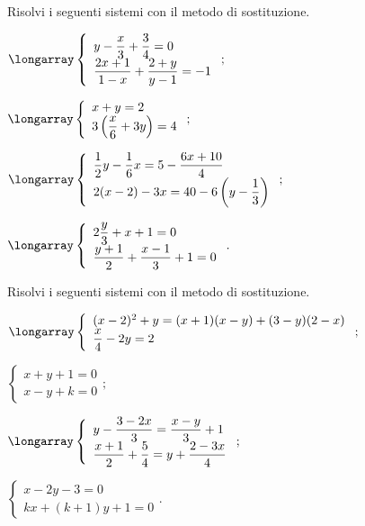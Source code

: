 \begin{esercizio}[\Ast]
 \label{ese:22.12}
Risolvi i seguenti sistemi con il metodo di sostituzione.
 \begin{multicols}{2}
 \begin{enumeratea}
  \item $\longarray\left\{\begin{array}{l}y-\dfrac{x}{3}+\dfrac{3}{4}=0\\\dfrac{2x+1}{1-x}+\dfrac{2+y}{y-1}=-1\end{array}\right.;$
\item $\longarray\left\{\begin{array}{l}x+y=2\\3\left(\dfrac{x}{6}+3y\right)=4\end{array}\right.;$
\item $\longarray\left\{\begin{array}{l}\dfrac{1}{2}y-\dfrac{1}{6}x=5-\dfrac{6x+10}{4}\\2(x-2)-3x=40-6\left(y-\dfrac{1}{3}\right)\end{array}\right.;$
\item $\longarray\left\{\begin{array}{l}2\dfrac{y}{3}+x+1=0\\\dfrac{y+1}{2}+\dfrac{x-1}{3}+1=0\end{array}\right..$
 \end{enumeratea}
 \end{multicols}
\end{esercizio}

\begin{esercizio}[\Ast]
 \label{ese:22.13}
Risolvi i seguenti sistemi con il metodo di sostituzione.

 \begin{enumeratea}
  \item $\longarray\left\{\begin{array}{l}(x-2)^{2}+y=(x+1)(x-y)+(3-y)(2-x)\\\dfrac{x}{4}-2y=2 \end{array}\right.;$
  \item $\left\{\begin{array}{l}x+y+1=0 \\x-y+k=0 \end{array}\right.;$
\item $\longarray\left\{\begin{array}{l}y-\dfrac{3-2x}{3}=\dfrac{x-y}{3}+1\\\dfrac{x+1}{2}+\dfrac{5}{4}=y+\dfrac{2-3x}{4}\end{array}\right.;$
\item $\left\{\begin{array}{l}x-2y-3=0\\kx+(k+1)y+1=0 \end{array}\right..$
 \end{enumeratea}

\end{esercizio}


